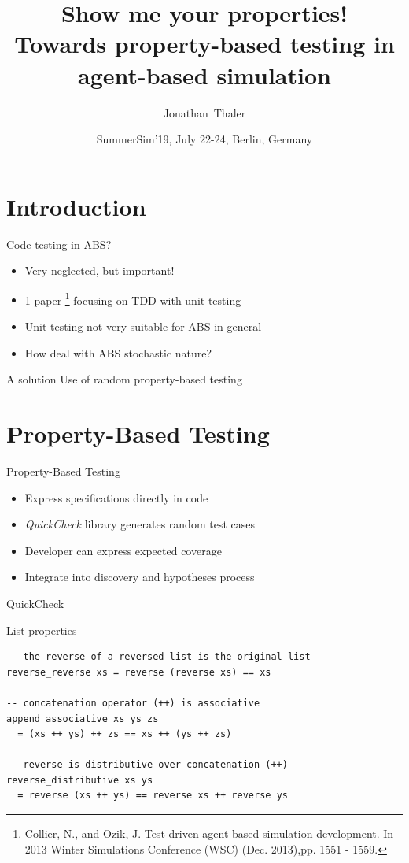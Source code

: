\documentclass{beamer} %
\title[Show me your properties! Towards property-based testing in agent-based simulation] 
{%
  Show me your properties! \\ \tiny{Towards property-based testing in agent-based simulation}
}
\author[Thaler]
{
  Jonathan~Thaler
}
\institute[University of Nottingham, United Kingdom]
{
  University of Nottingham, United Kingdom
}
\date[SummerSim'19, July 22-24, Berlin, Germany]
{SummerSim'19, July 22-24, Berlin, Germany}
\begin{document}
\begin{frame}
\titlepage
\end{frame}

\section{Introduction}
\begin{frame}{Code testing in ABS?}
\begin{itemize}
	\item Very neglected, but important!
	\item 1 paper \footnote{Collier, N., and Ozik, J. Test-driven agent-based simulation development. In 2013 Winter Simulations Conference (WSC) (Dec. 2013),pp. 1551 - 1559.} focusing on TDD with unit testing
  	\item Unit testing not very suitable for ABS in general
  	\item How deal with ABS stochastic nature?
\end{itemize}

\begin{block}{A solution}
Use of random property-based testing
\end{block}
\end{frame}

\section{Property-Based Testing}
\begin{frame}{Property-Based Testing}
  \begin{itemize}
    \item Express specifications directly in code
    \item \textit{QuickCheck} library generates random test cases
    \item Developer can express expected coverage
    \item Integrate into discovery and hypotheses process
  \end{itemize}
\end{frame}

\begin{frame}[fragile]{QuickCheck}
\begin{block}{List properties}
\begin{verbatim}
-- the reverse of a reversed list is the original list
reverse_reverse xs = reverse (reverse xs) == xs

-- concatenation operator (++) is associative
append_associative xs ys zs 
  = (xs ++ ys) ++ zs == xs ++ (ys ++ zs)

-- reverse is distributive over concatenation (++)
reverse_distributive xs ys 
  = reverse (xs ++ ys) == reverse xs ++ reverse ys
\end{verbatim}
\end{block}
\end{frame}
\end{document}

